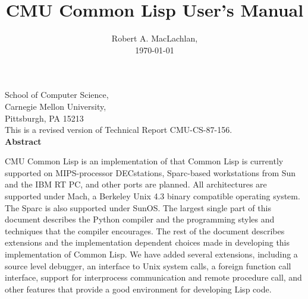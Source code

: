 \pagestyle{headings}


\alwaysrefill
{}

\def\theabstract{
CMU Common Lisp is an implementation of that Common Lisp is currently
supported on MIPS-processor DECstations, Sparc-based workstations from
Sun and the IBM RT PC, and other ports are planned.  All architectures
are supported under Mach, a Berkeley Unix 4.3 binary compatible
operating system.  The Sparc is also supported under SunOS.  The largest
single part of this document describes the Python compiler and the
programming styles and techniques that the compiler encourages.  The
rest of the document describes extensions and the implementation
dependent choices made in developing this implementation of Common Lisp.
We have added several extensions, including a source level debugger, an
interface to Unix system calls, a foreign function call interface,
support for interprocess communication and remote procedure call, and
other features that provide a good environment for developing Lisp code.
}

\begin{iftex}
\pagestyle{empty}
\title{CMU Common Lisp User's Manual}

\author{Robert A. MacLachlan, \\
\today}

\maketitle

\begin{center}
School of Computer Science,\\
Carnegie Mellon University,\\
Pittsburgh, PA 15213\\
\vspace{3 em}
This is a revised version of Technical Report CMU-CS-87-156.\\
\vspace{2 em}
{\bf Abstract\\}
\end{center}

\noindent
\theabstract

\vfill

\researchcredit

\clearpage
\pagestyle{headings}
\tableofcontents

\clearpage
{}
\end{iftex}

